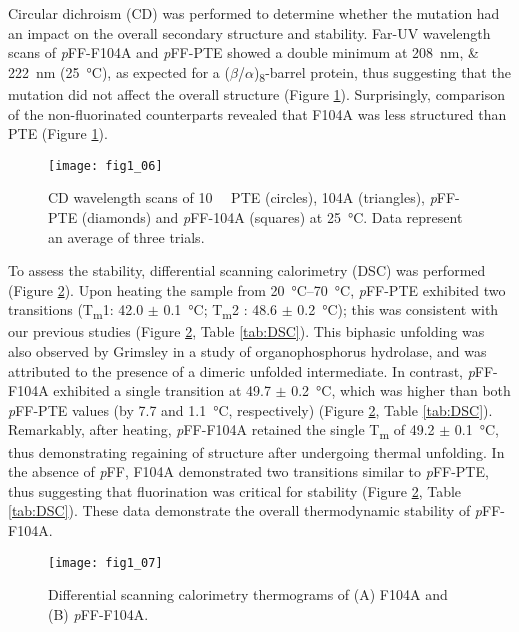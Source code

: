 \begin{refsection}
Circular dichroism (CD) was performed to determine whether the mutation had an
impact on the overall secondary structure and stability. Far-UV wavelength
scans of \emph{p}FF-F104A and \emph{p}FF-PTE showed a double minimum at
\SIlist{208;222}{\nm} (\SI{25}{\celsius}), as expected for a
($\beta$/$\alpha$)\textsubscript{8}-barrel protein, thus suggesting that the
mutation did not affect the overall structure (Figure \ref{fig:CD-fig}).
Surprisingly, comparison of the non-fluorinated counterparts revealed that
F104A was less structured than PTE (Figure \ref{fig:CD-fig}). 
\begin{figure}[htbp] \centering \texttt{[image: fig1\_06]}
    \caption[CD wavelength scans of \SI{10}{\micro\Molar} PTE (circles), 104A (triangles),
    \emph{p}FF-PTE (diamonds) and \emph{p}FF-104A (squares) at
\SI{25}{\celsius}. Data represent an average of three trials.]{CD wavelength
    scans of \SI{10}{\micro\Molar} PTE (circles), 104A (triangles),
    \emph{p}FF-PTE (diamonds) and \emph{p}FF-104A (squares) at
    \SI{25}{\celsius}. Data represent an average of three trials.}
    \label{fig:CD-fig} 
\end{figure}

To assess the stability, differential scanning calorimetry (DSC) was performed
(Figure \ref{fig:DSC-fig}). Upon heating the sample from
\SIrange{20}{70}{\celsius}, \emph{p}FF-PTE exhibited two transitions
(T\textsubscript{m}1: 42.0 $\pm$ \SI{0.1}{\celsius}; T\textsubscript{m}2 : 48.6
$\pm$ \SI{0.2}{\celsius}); this was consistent with our previous studies
\cite{Baker2011b} (Figure \ref{fig:DSC-fig}, Table \ref{tab:DSC}). This
biphasic unfolding was also observed by Grimsley   in a study of
organophosphorus hydrolase, and was attributed to the presence of a dimeric
unfolded intermediate\cite{Grimsley1997b}. In contrast, \emph{p}FF-F104A
exhibited a single transition at 49.7 $\pm$ \SI{0.2}{\celsius}, which was
higher than both \emph{p}FF-PTE values (by 7.7 and \SI{1.1}{\celsius},
respectively) (Figure \ref{fig:DSC-fig}, Table \ref{tab:DSC}). Remarkably,
after heating, \emph{p}FF-F104A retained the single T\textsubscript{m} of 49.2
$\pm$ \SI{0.1}{\celsius}, thus demonstrating regaining of structure after
undergoing thermal unfolding.  In the absence of \emph{p}FF, F104A demonstrated
two transitions similar to \emph{p}FF-PTE, thus suggesting that fluorination
was critical for stability (Figure \ref{fig:DSC-fig}, Table \ref{tab:DSC}).
These data demonstrate the overall thermodynamic stability of \emph{p}FF-F104A.
\begin{figure}[htbp] \centering \texttt{[image: fig1\_07]}
    \caption[Differential scanning calorimetry thermograms of (A) F104A and (B)
    \emph{p}FF-F104A.]{Differential scanning calorimetry thermograms of (A)
        F104A and (B) \emph{p}FF-F104A.} \label{fig:DSC-fig} 
\end{figure}


\end{refsection}
